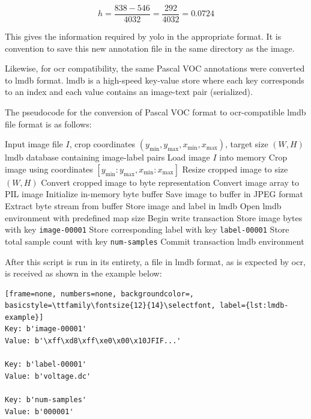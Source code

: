 \begin{equation}
h = \frac{838 - 546}{4032} = \frac{292}{4032} = 0.0724
\label{eq:voc-yolo-h}
\end{equation}

This gives the information required by \gls{yolo} in the appropriate format. It is convention to save this new annotation file in the same directory as the image.

Likewise, for \gls{ocr} compatibility, the same Pascal VOC annotations were converted to \gls{lmdb} format. \gls{lmdb} is a high-speed key-value store where each key corresponds to an index and each value contains an image-text pair (serialized).

The pseudocode for the conversion of Pascal VOC format to \gls{ocr}-compatible \gls{lmdb} file format is as follows:

\begin{algorithm}
\caption{Image Cropping and LMDB Dataset Creation}
\label{algo:image-crop-lmdb}
\begin{algorithmic}
\Require Input image file $I$, crop coordinates $(y_{\min}, y_{\max}, x_{\min}, x_{\max})$, target size $(W, H)$
\Ensure \gls{lmdb} database containing image-label pairs
\State Load image $I$ into memory
\State Crop image using coordinates $[y_{\min} : y_{\max}, x_{\min} : x_{\max}]$
\State Resize cropped image to size $(W, H)$
\State Convert cropped image to byte representation
\State Convert image array to PIL image
\State Initialize in-memory byte buffer
\State Save image to buffer in JPEG format
\State Extract byte stream from buffer
\State Store image and label in \gls{lmdb}
\State Open \gls{lmdb} environment with predefined map size
\State Begin write transaction
\State Store image bytes with key \texttt{image-00001}
\State Store corresponding label with key \texttt{label-00001}
\State Store total sample count with key \texttt{num-samples}
\State Commit transaction
\State \Return \gls{lmdb} environment
\end{algorithmic}
\end{algorithm}

After this script is run in its entirety, a file in \gls{lmdb} format, as is expected by \gls{ocr}, is received as shown in the example below:

\begin{lstlisting}[frame=none, numbers=none, backgroundcolor=, basicstyle=\ttfamily\fontsize{12}{14}\selectfont, label={lst:lmdb-example}]
Key: b'image-00001'
Value: b'\xff\xd8\xff\xe0\x00\x10JFIF...'

Key: b'label-00001'
Value: b'voltage.dc'

Key: b'num-samples'
Value: b'000001'
\end{lstlisting}

